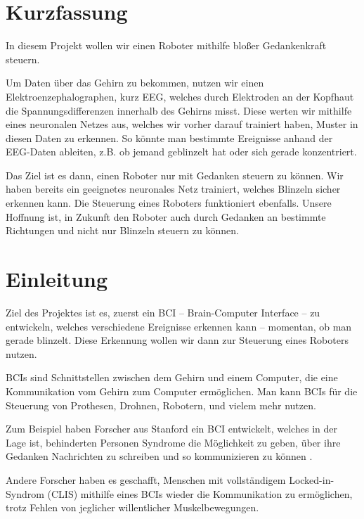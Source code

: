 \documentclass[11pt]{scrartcl}
\begin{document}
	\newpage

	
	\tableofcontents
	
	\newpage

	\section{Kurzfassung}


	In diesem Projekt wollen wir einen Roboter mithilfe bloßer Gedankenkraft steuern.

	Um Daten über das Gehirn zu bekommen, nutzen wir einen Elektroenzephalographen, kurz EEG, welches durch Elektroden an der Kopfhaut die Spannungsdifferenzen innerhalb des Gehirns misst. Diese werten wir mithilfe eines neuronalen Netzes aus, welches wir vorher darauf trainiert haben, Muster in diesen Daten zu erkennen. So könnte man bestimmte Ereignisse anhand der EEG-Daten ableiten, z.B. ob jemand geblinzelt hat oder sich gerade konzentriert.
	
	Das Ziel ist es dann, einen Roboter nur mit Gedanken steuern zu können.
	Wir haben bereits ein geeignetes neuronales Netz trainiert, welches Blinzeln sicher erkennen kann. Die Steuerung eines Roboters funktioniert ebenfalls.
	Unsere Hoffnung ist, in Zukunft den Roboter auch durch Gedanken an bestimmte Richtungen und nicht nur Blinzeln steuern zu können.

	\section{Einleitung}

	Ziel des Projektes ist es, zuerst ein BCI -- Brain-Computer Interface -- zu entwickeln, welches verschiedene Ereignisse erkennen kann -- momentan, ob man gerade blinzelt. Diese Erkennung wollen wir dann zur Steuerung eines Roboters nutzen.

	BCIs sind Schnittstellen zwischen dem Gehirn und einem Computer, die eine Kommunikation vom Gehirn zum Computer ermöglichen. Man kann BCIs für die Steuerung von Prothesen, Drohnen, Robotern, und vielem mehr nutzen. \cite{bci-explained}

	Zum Beispiel haben Forscher aus Stanford ein BCI entwickelt, welches in der Lage ist, behinderten Personen Syndrome die Möglichkeit zu geben, über ihre Gedanken Nachrichten zu schreiben und so kommunizieren zu können \cite{brain2text}.

	Andere Forscher haben es geschafft, Menschen mit vollständigem Locked-in-Syndrom (CLIS) mithilfe eines BCIs wieder die Kommunikation zu ermöglichen, trotz Fehlen von jeglicher willentlicher Muskelbewegungen. \cite{BCIChaudhary}
	
\end{document}

